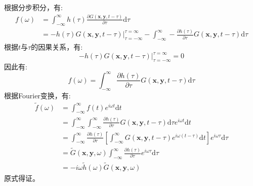 \begin{enumerate}
\begin{enumerate}
            根据分步积分，有:
            \begin{equation}
                \begin{aligned}
                    f(\omega) &= \int_{-\infty}^{\infty} h(\tau) \frac{\partial G(\mathbf{x},\mathbf{y},t-\tau)}{\partial \tau} \mathrm{d} \tau \\
                    &= \left. - h(\tau) G(\mathbf{x},\mathbf{y},t-\tau) \right|_{\tau = - \infty}^{\tau = \infty} - \int_{-\infty}^{\infty} - \frac{\partial h(\tau)}{\partial \tau} G(\mathbf{x},\mathbf{y},t-\tau) \mathrm{d} \tau
                \end{aligned}
            \end{equation}
            根据$t$与$\tau$的因果关系，有:
            \begin{equation}
                \left. - h(\tau) G(\mathbf{x},\mathbf{y},t-\tau) \right|_{\tau = - \infty}^{\tau = \infty} = 0
            \end{equation}
            因此有:
            \begin{equation}
                \label{eq:mid conclusion 2}
                f(\omega) = \int_{-\infty}^{\infty} \frac{\partial h(\tau)}{\partial \tau} G(\mathbf{x},\mathbf{y},t-\tau) \mathrm{d} \tau
            \end{equation}
            根据Fourier变换，有:
            \begin{equation}
                \label{eq:conclusion 2}
                \begin{aligned}
                    \tilde{f}(\omega) &= \int_{-\infty}^{\infty} f(t) e^{i \omega t} \mathrm{d} t \\
                    &= \int_{-\infty}^{\infty} \int_{-\infty}^{\infty} \frac{\partial h(\tau)}{\partial \tau} G(\mathbf{x},\mathbf{y},t-\tau) \mathrm{d} \tau e^{i \omega t} \mathrm{d} t \\
                    &= \int_{-\infty}^{\infty} \frac{\partial h(\tau)}{\partial \tau} \left[ \int_{-\infty}^{\infty} G(\mathbf{x},\mathbf{y},t-\tau) e^{i \omega (t-\tau)} \mathrm{d} t \right] e^{i \omega \tau} \mathrm{d} \tau \\
                    &= \tilde{G} (\mathbf{x},\mathbf{y},\omega) \int_{-\infty}^{\infty} \frac{\partial h(\tau)}{\partial \tau} e^{i \omega \tau} \mathrm{d} \tau \\
                    &= - i \omega \tilde{h}(\omega) \tilde{G} (\mathbf{x},\mathbf{y},\omega)
                \end{aligned}
            \end{equation}
            原式得证。
    \end{enumerate}



\end{enumerate}
